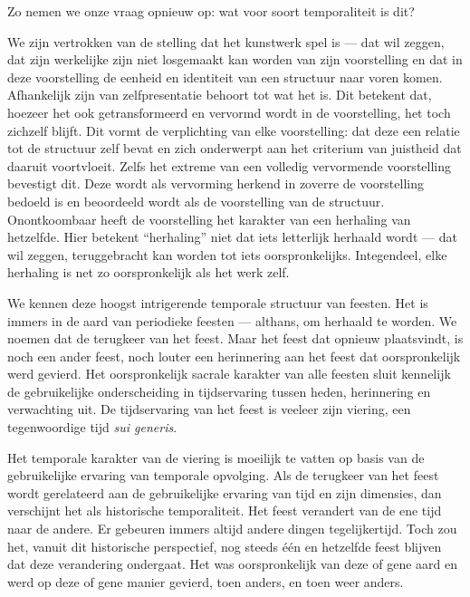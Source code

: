 Zo nemen we onze vraag opnieuw op: wat voor soort temporaliteit is dit?

We zijn vertrokken van de stelling dat het kunstwerk spel is — dat wil zeggen, dat zijn werkelijke zijn niet losgemaakt kan worden van zijn voorstelling en dat in deze voorstelling de eenheid en identiteit van een structuur naar voren komen. Afhankelijk zijn van zelfpresentatie behoort tot wat het is. Dit betekent dat, hoezeer het ook getransformeerd en vervormd wordt in de voorstelling, het toch zichzelf blijft. Dit vormt de verplichting van elke voorstelling: dat deze een relatie tot de structuur zelf bevat en zich onderwerpt aan het criterium van juistheid dat daaruit voortvloeit. Zelfs het extreme van een volledig vervormende voorstelling bevestigt dit. Deze wordt als vervorming herkend in zoverre de voorstelling bedoeld is en beoordeeld wordt als de voorstelling van de structuur. Onontkoombaar heeft de voorstelling het karakter van een herhaling van hetzelfde. Hier betekent ``herhaling'' niet dat iets letterlijk herhaald wordt — dat wil zeggen, teruggebracht kan worden tot iets oorspronkelijks. Integendeel, elke herhaling is net zo oorspronkelijk als het werk zelf.

We kennen deze hoogst intrigerende temporale structuur van feesten. Het is immers in de aard van periodieke feesten — althans, om herhaald te worden. We noemen dat de terugkeer van het feest. Maar het feest dat opnieuw plaatsvindt, is noch een ander feest, noch louter een herinnering aan het feest dat oorspronkelijk werd gevierd. Het oorspronkelijk sacrale karakter van alle feesten sluit kennelijk de gebruikelijke onderscheiding in tijdservaring tussen heden, herinnering en verwachting uit. De tijdservaring van het feest is veeleer zijn viering, een tegenwoordige tijd \textit{sui generis}.

Het temporale karakter van de viering is moeilijk te vatten op basis van de gebruikelijke ervaring van temporale opvolging. Als de terugkeer van het feest wordt gerelateerd aan de gebruikelijke ervaring van tijd en zijn dimensies, dan verschijnt het als historische temporaliteit. Het feest verandert van de ene tijd naar de andere. Er gebeuren immers altijd andere dingen tegelijkertijd. Toch zou het, vanuit dit historische perspectief, nog steeds één en hetzelfde feest blijven dat deze verandering ondergaat. Het was oorspronkelijk van deze of gene aard en werd op deze of gene manier gevierd, toen anders, en toen weer anders.


